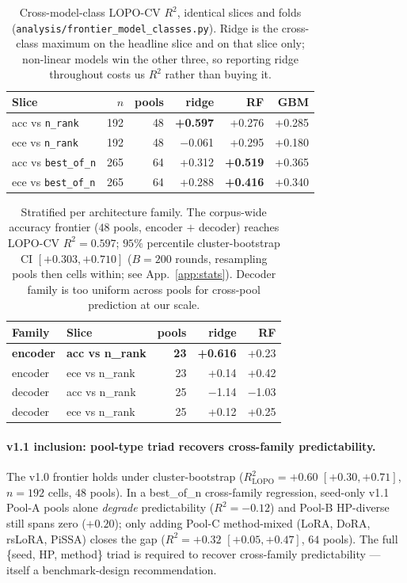 \documentclass[11pt]{article}
\begin{document}
\begin{table}[h]
\centering
\caption{Cross-model-class LOPO-CV $R^2$, identical slices and folds (\texttt{analysis/\allowbreak frontier\_\allowbreak model\_\allowbreak classes.\allowbreak py}). Ridge is the cross-class maximum on the headline slice and on that slice only; non-linear models win the other three, so reporting ridge throughout costs us $R^2$ rather than buying it.}
\label{tab:frontier_cross}
\small
\setlength{\tabcolsep}{3pt}
\begin{tabular}{@{}lrrrrr@{}}
\toprule
Slice & $n$ & pools & ridge & RF & GBM \\
\midrule
acc vs \texttt{n\_rank}     & 192 & 48 & \textbf{+0.597} & +0.276 & +0.285 \\
ece vs \texttt{n\_rank}     & 192 & 48 & $-$0.061 & +0.295 & +0.180 \\
acc vs \texttt{best\_of\_n} & 265 & 64 & +0.312 & \textbf{+0.519} & +0.365 \\
ece vs \texttt{best\_of\_n} & 265 & 64 & +0.288 & \textbf{+0.416} & +0.340 \\
\bottomrule
\end{tabular}
\end{table}

\begin{table}[h]
\centering
\caption{Stratified per architecture family. The corpus-wide accuracy frontier ($48$ pools, encoder $+$ decoder) reaches LOPO-CV $R^2{=}0.597$; $95\%$ percentile cluster-bootstrap CI $[{+}0.303, {+}0.710]$ ($B{=}200$ rounds, resampling pools then cells within; see App.~\ref{app:stats}). Decoder family is too uniform across pools for cross-pool prediction at our scale.}
\label{tab:frontier_strat}
\small
\begin{tabular}{llrrr}
\toprule
Family & Slice & pools & ridge & RF \\
\midrule
\textbf{encoder} & \textbf{acc vs n\_rank} & \textbf{23} & \textbf{+0.616} & +0.23 \\
encoder & ece vs n\_rank & 23 & +0.14 & +0.42 \\
decoder & acc vs n\_rank & 25 & $-$1.14 & $-$1.03 \\
decoder & ece vs n\_rank & 25 & +0.12 & +0.25 \\
\bottomrule
\end{tabular}
\end{table}



\paragraph{v1.1 inclusion: pool-type triad recovers cross-family predictability.} The v1.0 frontier holds under cluster-bootstrap ($R^2_{\text{LOPO}}{=}{+}0.60$ $[{+}0.30, {+}0.71]$, $n{=}192$ cells, $48$ pools). In a best\_of\_n cross-family regression, seed-only v1.1 Pool-A pools alone \emph{degrade} predictability ($R^2{=}{-}0.12$) and Pool-B HP-diverse still spans zero ($+0.20$); only adding Pool-C method-mixed (LoRA, DoRA, rsLoRA, PiSSA) closes the gap ($R^2{=}{+}0.32$ $[{+}0.05, {+}0.47]$, $64$ pools). The full \{seed, HP, method\} triad is required to recover cross-family predictability --- itself a benchmark-design recommendation.
\end{document}
